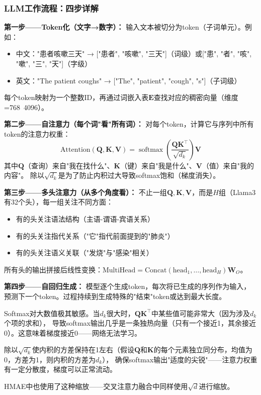 \documentclass[11pt,a4paper]{ctexart}
\DeclareMathOperator{\softmax}{softmax}
\begin{document}
\subsubsection{LLM工作流程：四步详解}

\textbf{第一步——Token化（文字→数字）：} 输入文本被切分为token（子词单元）。例如：
\begin{itemize}[nosep]
\item 中文："患者咳嗽三天" → ["患者", "咳嗽", "三天"]（词级）或["患", "者", "咳", "嗽", "三", "天"]（字级）
\item 英文："The patient coughs" → ["The", "patient", "cough", "s"]（子词级）
\end{itemize}
每个token映射为一个整数ID，再通过词嵌入表$\mathbf{E}$查找对应的稠密向量（维度=768~4096）。

\textbf{第二步——自注意力（每个词"看"所有词）：}
对每个token，计算它与序列中所有token的注意力权重：
$$\text{Attention}(\mathbf{Q}, \mathbf{K}, \mathbf{V}) = \softmax\left(\frac{\mathbf{Q}\mathbf{K}^\top}{\sqrt{d_k}}\right)\mathbf{V}$$
其中$\mathbf{Q}$（查询）来自"我在找什么"、$\mathbf{K}$（键）来自"我是什么"、$\mathbf{V}$（值）来自"我的内容"。
除以$\sqrt{d_k}$是为了防止内积过大导致softmax饱和（梯度消失）。

\textbf{第三步——多头注意力（从多个角度看）：}
不止一组$\mathbf{Q},\mathbf{K},\mathbf{V}$，而是$H$组（Llama3有32个头），每一组关注不同方面：
\begin{itemize}[nosep]
\item 有的头关注语法结构（主语-谓语-宾语关系）
\item 有的头关注指代关系（"它"指代前面提到的"肺炎"）
\item 有的头关注语义关联（"发烧"与"感染"相关）
\end{itemize}
所有头的输出拼接后线性变换：$\text{MultiHead} = \text{Concat}(\text{head}_1, \ldots, \text{head}_H)\mathbf{W}_O$。

\textbf{第四步——自回归生成：} 模型逐个生成token，每次将已生成的序列作为输入，预测下一个token。过程持续到生成特殊的"结束"token或达到最大长度。

\begin{deepbox}
Softmax对大数值极其敏感。当$d_k$很大时，$\mathbf{Q}\mathbf{K}^\top$中某些值可能非常大（因为涉及$d_k$个项的求和），
导致softmax输出几乎是一条独热向量（只有一个接近1，其余接近0）。这意味着梯度接近0——网络无法学习。

除以$\sqrt{d_k}$使内积的方差保持在1左右（假设$\mathbf{Q}$和$\mathbf{K}$的每个元素独立同分布，均值为0，方差为1，则内积的方差为$d_k$），
确保softmax输出"适度的尖锐"——注意力权重有一定分散度，梯度可以正常流动。

HMAE中也使用了这种缩放——交叉注意力融合中同样使用$\sqrt{d}$进行缩放。
\end{deepbox}
\end{document}
